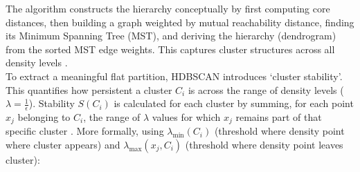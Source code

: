 \documentclass[10pt,oneside]{report}
\begin{document}

The algorithm constructs the hierarchy conceptually by first computing core distances, then building a graph weighted by mutual reachability distance, finding its Minimum Spanning Tree (MST), and deriving the hierarchy (dendrogram) from the sorted MST edge weights. This captures cluster structures across all density levels \cite{campello2013density}. \\


\noindent To extract a meaningful flat partition, HDBSCAN introduces `cluster stability'. 
This quantifies how persistent a cluster $C_i$ is across the range of density levels ($\lambda = \frac 1 \epsilon$). Stability $S(C_i)$ is calculated for each cluster by summing, for each point $x_j$ belonging to $C_i$, the range of $\lambda$ values for which $x_j$ remains part of that specific cluster \cite{campello2013density}. More formally, using $\lambda_{\text{min}}(C_i)$ (threshold where density point where cluster appears) and $\lambda_{\text{max}}(x_j, C_i)$ (threshold where density point leaves cluster):
\end{document}
